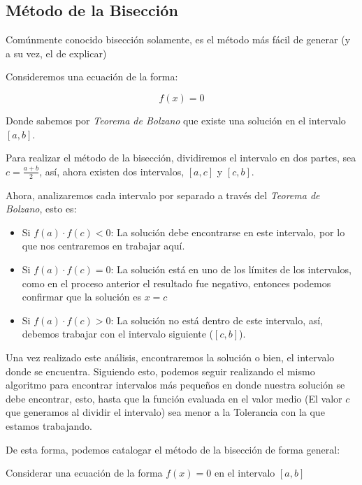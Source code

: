 \subsection{Método de la Bisección}

Comúnmente conocido bisección solamente, es el método más fácil de generar (y a su vez, el de explicar)

Consideremos una ecuación de la forma:

\begin{equation}
    f(x) = 0
\end{equation}

Donde sabemos por \textit{Teorema de Bolzano} que existe una solución en el intervalo $[a,b]$. 

Para realizar el método de la bisección, dividiremos el intervalo en dos partes, sea $c = \frac{a+b}{2}$, así, ahora existen dos intervalos, $[a, c]$ y $[c, b]$.

Ahora, analizaremos cada intervalo por separado a través del \textit{Teorema de Bolzano}, esto es:

\begin{itemize}
    \item Si $f(a) \cdot f(c) < 0$: La solución debe encontrarse en este intervalo, por lo que nos centraremos en trabajar aquí.
    \item Si $f(a) \cdot f(c) = 0$: La solución está en uno de los límites de los intervalos, como en el proceso anterior el resultado fue negativo, entonces podemos confirmar que la solución es $x= c$
    \item Si $f(a) \cdot f(c) > 0$: La solución no está dentro de este intervalo, así, debemos trabajar con el intervalo siguiente ($[c,b]$).
\end{itemize}

Una vez realizado este análisis, encontraremos la solución o bien, el intervalo donde se encuentra. Siguiendo esto, podemos seguir realizando el mismo algoritmo para encontrar intervalos más pequeños en donde nuestra solución se debe encontrar, esto, hasta que la función evaluada en el valor medio (El valor $c$ que generamos al dividir el intervalo) sea menor a la Tolerancia con la que estamos trabajando.

De esta forma, podemos catalogar el método de la bisección de forma general:

Considerar una ecuación de la forma $f(x) = 0$ en el intervalo $[a,b]$

